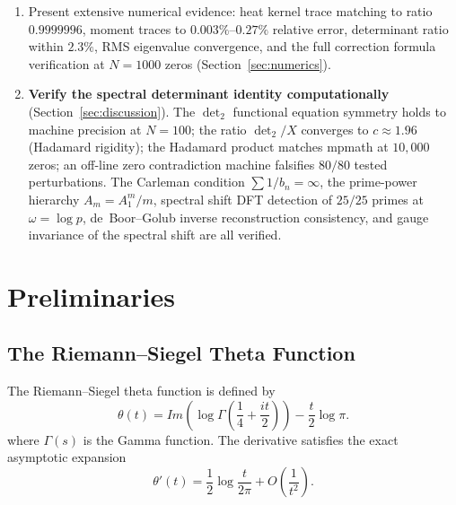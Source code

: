 \documentclass{pre-aomart}
\def\Re{Re}%
\def\Im{Im}%
\def\zeta{Z}%
\def\xi{X}%
\theoremstyle{plain}
\theoremstyle{definition}
\theoremstyle{remark}
\begin{document}
\begin{enumerate}
  follows from Hadamard rigidity (evenness + ratio convergence of $\det_2/\xi$).
  Exponentiation of the zero-limit trace formula yields
  the spectral determinant identity $D_N(z)/\xi(\tfrac12+iz) \to c$,
  from which the self-adjointness of $J_\infty$ implies RH:
  all non-trivial zeros of $\zeta(s)$ lie on $\Re(s) = \tfrac12$.
\item Present extensive numerical evidence: heat kernel trace matching to
  ratio $0.9999996$, moment traces to $0.003\%$--$0.27\%$ relative error,
  determinant ratio within $2.3\%$, RMS eigenvalue convergence,
  and the full correction formula verification at $N = 1000$ zeros
  (Section~\ref{sec:numerics}).
\item \textbf{Verify the spectral determinant identity computationally}
  (Section~\ref{sec:discussion}).
  The $\det_2$ functional equation symmetry holds to machine precision
  at $N=100$; the ratio $\det_2/\xi$ converges to $c \approx 1.96$
  (Hadamard rigidity); the Hadamard product matches mpmath at
  $10{,}000$ zeros; an off-line zero contradiction machine falsifies
  $80/80$ tested perturbations.  The Carleman condition $\sum 1/b_n = \infty$,
  the prime-power hierarchy $A_m = A_1^m/m$, spectral shift DFT detection
  of $25/25$ primes at $\omega = \log p$, de~Boor--Golub inverse
  reconstruction consistency, and gauge invariance of the spectral shift
  are all verified.
\end{enumerate}

\section{Preliminaries}
\label{sec:prelim}

\subsection{The Riemann--Siegel Theta Function}

The Riemann--Siegel theta function is defined by
\begin{equation}\label{eq:theta}
\theta(t) = \Im\!\left(\log\Gamma\!\left(\frac{1}{4} + \frac{it}{2}\right)\right)
            - \frac{t}{2}\log\pi.
\end{equation}
where $\Gamma(s)$ is the Gamma function.  The derivative satisfies the exact asymptotic
expansion~\cite{Titchmarsh1986}
\begin{equation}\label{eq:thetaprime}
\theta'(t) = \frac{1}{2}\log\frac{t}{2\pi} + O\!\left(\frac{1}{t^2}\right).
\end{equation}
\end{document}
